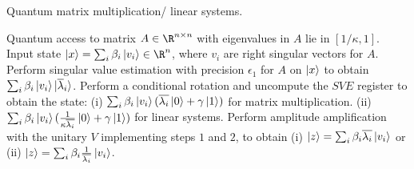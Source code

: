 \documentclass{article}
\begin{document}
\pagestyle{empty} 

\begin{algorithm}[H]
\caption{Quantum matrix multiplication/ linear systems.} \label{qmat}
\begin{algorithmic}[1]
\REQUIRE Quantum access to matrix $A \in \R^{n\times n}$ with eigenvalues in
$A$ lie in $[1/\kappa, 1]$. Input state $\ket{x}=\sum_{i} \beta_{i} \ket{v_{i}}\in \R^{n}$, where $v_{i}$ are right singular vectors for $A$.
\STATE Perform singular value estimation with precision $\epsilon_{1}$ for $A$ on $\ket{x}$ to obtain $\sum_{i} \beta_{i} \ket{v_{i}} \ket{\overline{\lambda}_{i}}$.
\STATE Perform a conditional rotation and uncompute the $SVE$ register to obtain the state: \nl
(i)  $\sum_{i} \beta_{i} \ket{v_{i}} ( \overline{\lambda_{i}}  \ket{0} + \gamma \ket{1})$ for matrix multiplication.  \nl
(ii) $\sum_{i} \beta_{i} \ket{v_{i}} ( \frac{1} {\kappa \overline{\lambda_{i}} }  \ket{0} + \gamma \ket{1})$ for linear systems. \nl
\STATE Perform amplitude amplification with the unitary $V$ implementing steps $1$ and $2$, to obtain (i) $\ket{z} = \sum_{i} \beta_{i} \overline{\lambda_{i}}  \ket{v_{i}}$ or (ii) $\ket{z} = \sum_{i} \beta_{i} \frac{1}{\overline{\lambda_{i}}} \ket{v_{i}} $. \nl
\end{algorithmic}
\end{algorithm}
\end{document}
